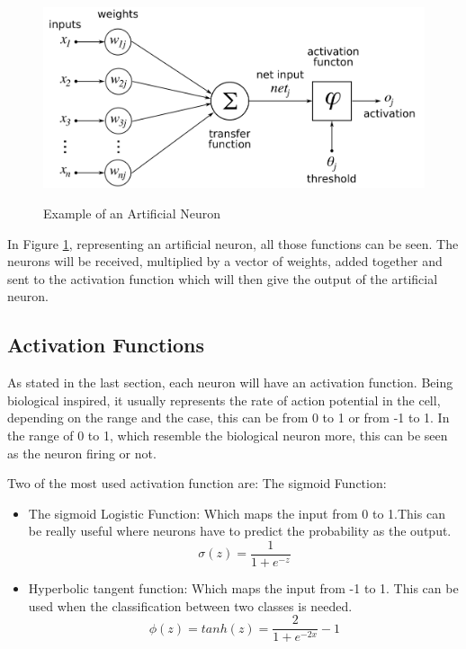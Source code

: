\begin{figure}[htp]
	\centering
	\includegraphics[width=1\textwidth]{Illustrations/artificialneuron.png}
	\caption{Example of an Artificial Neuron}\cite{ARTIFICIALNEURON}
	\label{fig:ArtificialNeuron}
\end{figure}
\newpage
In Figure \ref{fig:ArtificialNeuron}, representing an artificial neuron, all those functions can be seen. The neurons will be received, multiplied by a vector of weights, added together and sent to the activation function which will then give the output of the artificial neuron.

\subsection{Activation Functions}

As stated in the last section, each neuron will have an activation function. Being biological inspired, it usually represents the rate of action potential in the cell, depending on the range and the case, this can be from 0 to 1 or from -1 to 1. In the range of 0 to 1, which resemble the biological neuron more, this can be seen as the neuron firing or not.

Two of the most used activation function are:
The sigmoid Function:

\begin{itemize}
\item The sigmoid Logistic Function: Which maps the input from 0 to 1.This can be really useful where neurons have to predict the probability as the output.
\begin{equation}
 \sigma(z) = \frac{1}{1+e^{-z}}
\end{equation}

\item Hyperbolic tangent function: Which maps the input from -1 to 1. This can be used when the classification between two classes is needed.
\begin{equation}
 \phi(z) = tanh(z)= \frac{2}{1+e^{-2x}}-1
\end{equation}

\end{itemize}

